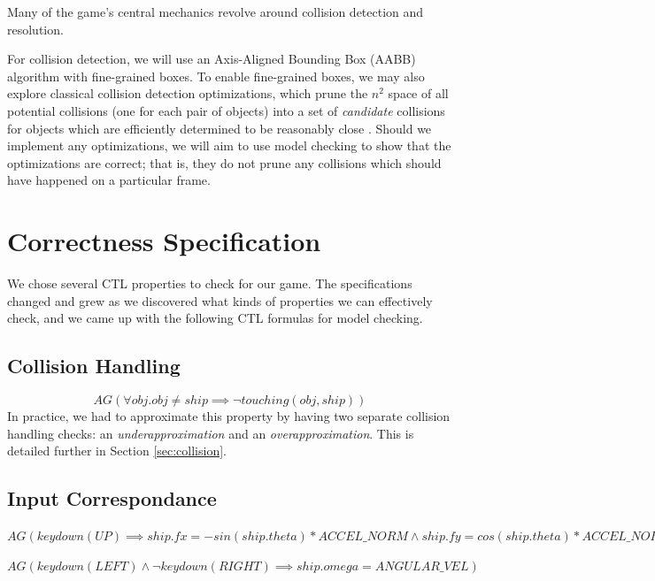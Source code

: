 \documentclass{article}
\begin{document}
        Many of the game's central mechanics revolve around collision detection
        and resolution.

        For collision detection, we will use an Axis-Aligned Bounding Box (AABB)
        algorithm with fine-grained boxes. To enable fine-grained boxes, we may
        also explore classical collision detection optimizations, which prune
        the $n^2$ space of all potential collisions (one for each pair of
        objects) into a set of \textit{candidate} collisions for objects which
        are efficiently determined to be reasonably close
        \cite{moore1988collision, palmer1995collision}. Should we implement any
        optimizations, we will aim to use model checking to show that the
        optimizations are correct; that is, they do not prune any collisions
        which should have happened on a particular frame.

\section{Correctness Specification}
\label{sec:properties}

    We chose several CTL properties to check for our game.
    The specifications changed and grew as we discovered what kinds of properties we can effectively check, and we came up with the following CTL formulas for model checking.

    \subsection{Collision Handling}

        $$AG(\forall obj. obj \neq ship \implies \lnot touching(obj,ship))$$
        In practice, we had to approximate this property by having two separate collision handling checks: an \emph{underapproximation} and an \emph{overapproximation}.
        This is detailed further in Section \ref{sec:collision}.

    \subsection{Input Correspondance}

        $AG(keydown(UP) \implies ship.fx = -sin(ship.theta) * ACCEL\_NORM
                        \land ship.fy = cos(ship.theta) * ACCEL\_NORM)$

        $AG(keydown(LEFT) \land \lnot keydown(RIGHT) \implies ship.omega = ANGULAR\_VEL)$
\end{document}

